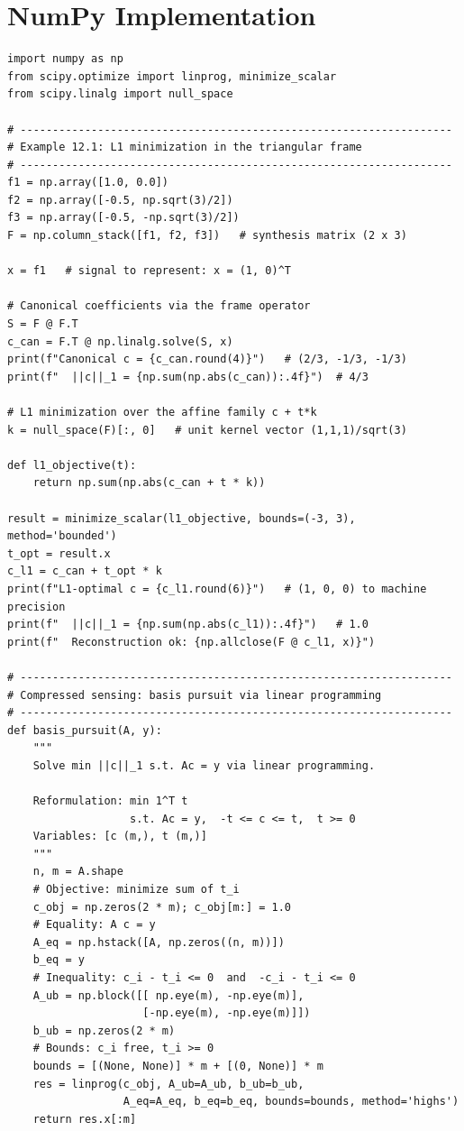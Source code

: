 \section{NumPy Implementation}
\label{sec:numpy-ch12}

\begin{lstlisting}[caption={Basis pursuit and compressed sensing in Python}]
import numpy as np
from scipy.optimize import linprog, minimize_scalar
from scipy.linalg import null_space

# -------------------------------------------------------------------
# Example 12.1: L1 minimization in the triangular frame
# -------------------------------------------------------------------
f1 = np.array([1.0, 0.0])
f2 = np.array([-0.5, np.sqrt(3)/2])
f3 = np.array([-0.5, -np.sqrt(3)/2])
F = np.column_stack([f1, f2, f3])   # synthesis matrix (2 x 3)

x = f1   # signal to represent: x = (1, 0)^T

# Canonical coefficients via the frame operator
S = F @ F.T
c_can = F.T @ np.linalg.solve(S, x)
print(f"Canonical c = {c_can.round(4)}")   # (2/3, -1/3, -1/3)
print(f"  ||c||_1 = {np.sum(np.abs(c_can)):.4f}")  # 4/3

# L1 minimization over the affine family c + t*k
k = null_space(F)[:, 0]   # unit kernel vector (1,1,1)/sqrt(3)

def l1_objective(t):
    return np.sum(np.abs(c_can + t * k))

result = minimize_scalar(l1_objective, bounds=(-3, 3), method='bounded')
t_opt = result.x
c_l1 = c_can + t_opt * k
print(f"L1-optimal c = {c_l1.round(6)}")   # (1, 0, 0) to machine precision
print(f"  ||c||_1 = {np.sum(np.abs(c_l1)):.4f}")   # 1.0
print(f"  Reconstruction ok: {np.allclose(F @ c_l1, x)}")

# -------------------------------------------------------------------
# Compressed sensing: basis pursuit via linear programming
# -------------------------------------------------------------------
def basis_pursuit(A, y):
    """
    Solve min ||c||_1 s.t. Ac = y via linear programming.

    Reformulation: min 1^T t
                   s.t. Ac = y,  -t <= c <= t,  t >= 0
    Variables: [c (m,), t (m,)]
    """
    n, m = A.shape
    # Objective: minimize sum of t_i
    c_obj = np.zeros(2 * m); c_obj[m:] = 1.0
    # Equality: A c = y
    A_eq = np.hstack([A, np.zeros((n, m))])
    b_eq = y
    # Inequality: c_i - t_i <= 0  and  -c_i - t_i <= 0
    A_ub = np.block([[ np.eye(m), -np.eye(m)],
                     [-np.eye(m), -np.eye(m)]])
    b_ub = np.zeros(2 * m)
    # Bounds: c_i free, t_i >= 0
    bounds = [(None, None)] * m + [(0, None)] * m
    res = linprog(c_obj, A_ub=A_ub, b_ub=b_ub,
                  A_eq=A_eq, b_eq=b_eq, bounds=bounds, method='highs')
    return res.x[:m]


\end{lstlisting}
